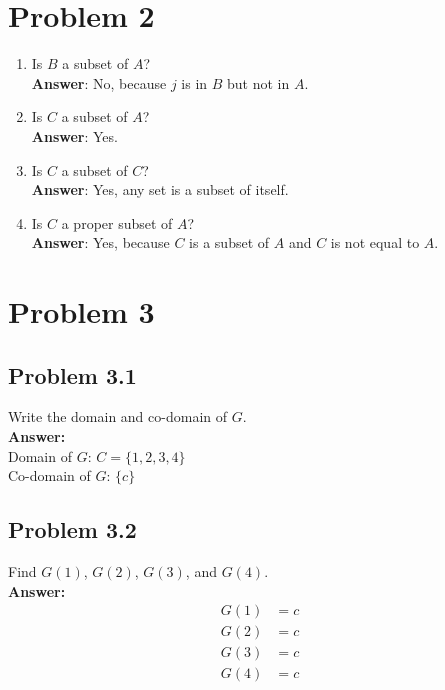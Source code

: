 \documentclass[a4paper, 10pt]{article}
\begin{document}
    \section{Problem 2}

    \begin{enumerate}
        \item Is \( B \) a subset of \( A \)? \\
        \textbf{Answer}: No, because \( j \) is in \( B \) but not in \( A \).

        \item Is \( C \) a subset of \( A \)? \\
        \textbf{Answer}: Yes.

        \item Is \( C \) a subset of \( C \)? \\
        \textbf{Answer}: Yes, any set is a subset of itself.

        \item Is \( C \) a proper subset of \( A \)? \\
        \textbf{Answer}: Yes, because \( C \) is a subset of \( A \) and \( C \) is not equal to \( A \).
    \end{enumerate}


    \section{Problem 3}

        \subsection{Problem 3.1}
            Write the domain and co-domain of \( G \). \\
            \textbf{Answer:} \\
            Domain of \( G \): \( C = \{1, 2, 3, 4\} \) \\
            Co-domain of \( G \): \( \{c\} \)

        \subsection{Problem 3.2}
            Find \( G(1) \), \( G(2) \), \( G(3) \), and \( G(4) \). \\

            \textbf{Answer:} \\
            \begin{align*}
                G(1) &= c \\
                G(2) &= c \\
                G(3) &= c \\
                G(4) &= c \\
            \end{align*}
\end{document}
